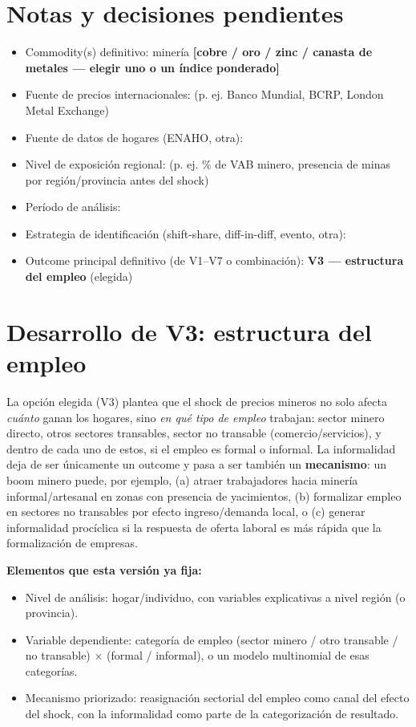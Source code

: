 \documentclass[11pt]{article}
\begin{document}
\section{Notas y decisiones pendientes}
\begin{itemize}
  \item Commodity(s) definitivo: minería \textbf{[cobre / oro / zinc / canasta de metales — elegir uno o un índice ponderado]}
  \item Fuente de precios internacionales: \underline{\hspace{4cm}} (p. ej. Banco Mundial, BCRP, London Metal Exchange)
  \item Fuente de datos de hogares (ENAHO, otra): \underline{\hspace{4cm}}
  \item Nivel de exposición regional: \underline{\hspace{4cm}} (p. ej. \% de VAB minero, presencia de minas por región/provincia antes del shock)
  \item Período de análisis: \underline{\hspace{4cm}}
  \item Estrategia de identificación (shift-share, diff-in-diff, evento, otra): \underline{\hspace{4cm}}
  \item Outcome principal definitivo (de V1–V7 o combinación): \textbf{V3 — estructura del empleo} (elegida)
\end{itemize}

\section{Desarrollo de V3: estructura del empleo}
La opción elegida (V3) plantea que el shock de precios mineros no solo afecta \emph{cuánto}
ganan los hogares, sino \emph{en qué tipo de empleo} trabajan: sector minero directo,
otros sectores transables, sector no transable (comercio/servicios), y dentro de cada uno
de estos, si el empleo es formal o informal. La informalidad deja de ser únicamente un
outcome y pasa a ser también un \textbf{mecanismo}: un boom minero puede, por ejemplo,
(a) atraer trabajadores hacia minería informal/artesanal en zonas con presencia de yacimientos,
(b) formalizar empleo en sectores no transables por efecto ingreso/demanda local, o
(c) generar informalidad procíclica si la respuesta de oferta laboral es más rápida que la
formalización de empresas.

\textbf{Elementos que esta versión ya fija:}
\begin{itemize}
  \item Nivel de análisis: hogar/individuo, con variables explicativas a nivel región (o provincia).
  \item Variable dependiente: categoría de empleo (sector minero / otro transable / no transable) $\times$ (formal / informal), o un modelo multinomial de esas categorías.
  \item Mecanismo priorizado: reasignación sectorial del empleo como canal del efecto del shock, con la informalidad como parte de la categorización de resultado.
\end{itemize}
\end{document}
